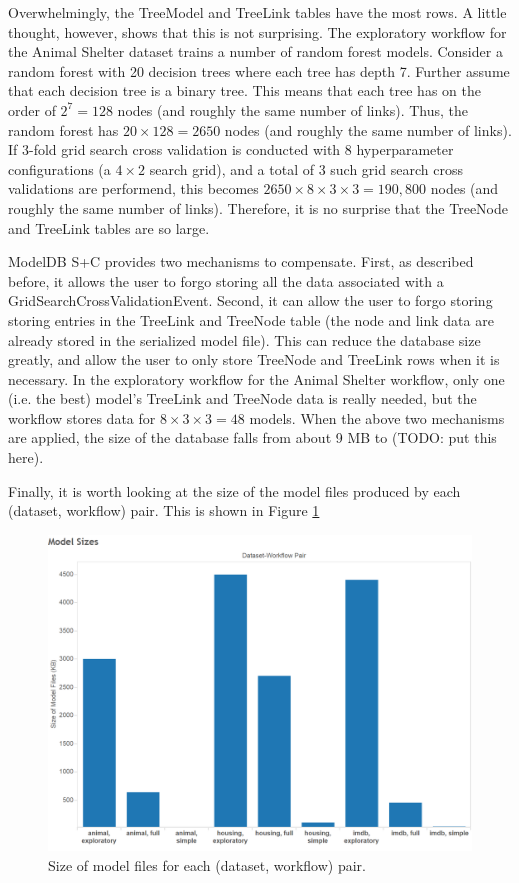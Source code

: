 Overwhelmingly, the TreeModel and TreeLink tables have the most rows. A little
thought, however, shows that this is not surprising. The exploratory workflow
for the Animal Shelter dataset trains a number of random forest models. Consider
a random forest with 20 decision trees where each tree has depth 7. Further assume
that each decision tree is a binary tree. This means that each tree has on the
order of $2^{7} = 128$ nodes (and roughly the same number of links). Thus, the
random forest has $20 \times 128 = 2650$ nodes (and roughly the same number of links).
If 3-fold grid search cross validation is conducted with 8 hyperparameter configurations (a $4 \times 2$ 
search grid), and a total of 3 such grid search cross validations are performend, 
this becomes $2650 \times 8 \times 3 \times 3 = 190,800$ nodes (and roughly the same number of links).
Therefore, it is no surprise that the TreeNode and TreeLink tables are so large.

ModelDB S+C provides two mechanisms to compensate. First, as described before, it
allows the user to forgo storing all the data associated with a GridSearchCrossValidationEvent.
Second, it can allow the user to forgo storing storing entries in the TreeLink and TreeNode table (the
node and link data are already stored in the serialized model file). This can reduce the database size
greatly, and allow the user to only store TreeNode and TreeLink rows when it is necessary. In the 
exploratory workflow for the Animal Shelter workflow, only one (i.e. the best)  model's TreeLink and TreeNode data is really needed,
but the workflow stores data for $8 \times 3 \times 3 = 48$ models. When the above two mechanisms are applied,
the size of the database falls from about 9 MB to  (TODO: put this here).

Finally, it is worth looking at the size of the model files produced by each (dataset, workflow) pair. This is shown in
Figure \ref{fig:modelsizes}

\begin{figure}
  \centering
  \includegraphics[width=5.0in]{modelsizes}
  \caption{
    Size of model files for each (dataset, workflow) pair.
  }
  \label{fig:modelsizes}
\end{figure}

